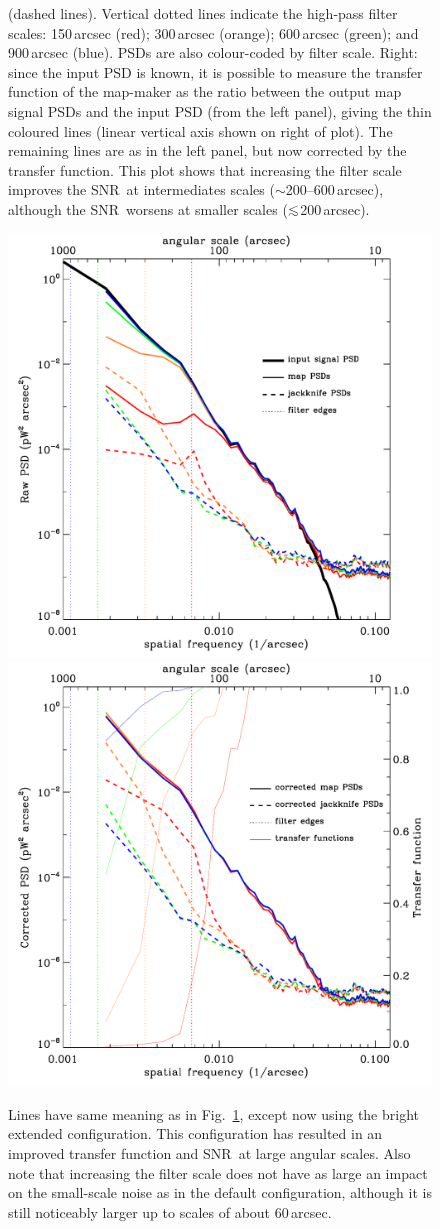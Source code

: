 \documentclass[useAMS,usenatbib,nofootinbib]{mn2e}
\newcommand{\snr}{SNR}
\def\lsim{\mathrel{\lower2.5pt\vbox{\lineskip=0pt\baselineskip=0pt
          \hbox{$<$}\hbox{$\sim$}}}}
\begin{document}
\begin{figure}
{(dashed lines). Vertical dotted lines indicate the high-pass filter
scales: 150\,arcsec (red); 300\,arcsec (orange); 600\,arcsec (green);
and 900\,arcsec (blue). PSDs are also colour-coded by filter
scale. Right: since the input PSD is known, it is possible to measure
the transfer function of the map-maker as the ratio between the output
map signal PSDs and the input PSD (from the left panel), giving the
thin coloured lines (linear vertical axis shown on right of plot). The
remaining lines are as in the left panel, but now corrected by the
transfer function. This plot shows that increasing the filter scale
improves the \snr\ at intermediates scales ($\sim$200--600\,arcsec),
although the \snr\ worsens at smaller scales ($\lsim$200\,arcsec).}
\label{fig:m17_def_ps}
\end{figure}

\begin{figure}
\centering
\includegraphics[width=0.49\linewidth]{pspec_m17_bright_extended.pdf}
\includegraphics[width=0.49\linewidth]{cor_pspec_m17_bright_extended.pdf}
\caption{Lines have same meaning as in Fig.~\ref{fig:m17_def_ps},
except now using the bright extended configuration. This configuration
has resulted in an improved transfer function and \snr\ at large
angular scales. Also note that increasing the filter scale does not
have as large an impact on the small-scale noise as in the default
configuration, although it is still noticeably larger up to scales of
about 60\,arcsec.}
\label{fig:m17_be_ps}
\end{figure}
\end{document}
